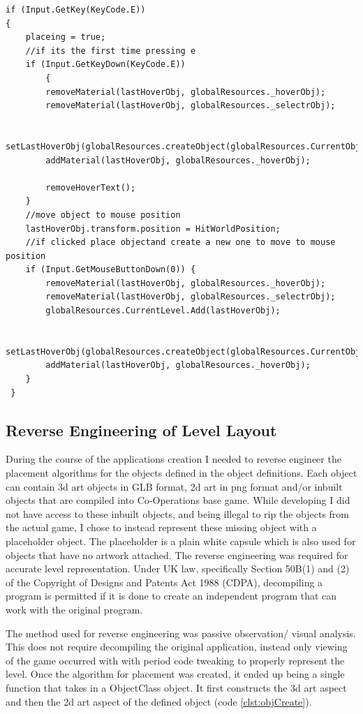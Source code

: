 \begin{minipage}{\textwidth}
\begin{lstlisting}[language={[Sharp]C}, caption=object placement code with highlighting, label=clst:objPlcHov]
if (Input.GetKey(KeyCode.E))
{
	placeing = true;
	//if its the first time pressing e
	if (Input.GetKeyDown(KeyCode.E))
		{
		removeMaterial(lastHoverObj, globalResources._hoverObj);
		removeMaterial(lastHoverObj, globalResources._selectrObj);

		setLastHoverObj(globalResources.createObject(globalResources.CurrentObjectSelectID));
		addMaterial(lastHoverObj, globalResources._hoverObj);

		removeHoverText();
	}
	//move object to mouse position
	lastHoverObj.transform.position = HitWorldPosition;
	//if clicked place objectand create a new one to move to mouse position
	if (Input.GetMouseButtonDown(0)) {
		removeMaterial(lastHoverObj, globalResources._hoverObj);
		removeMaterial(lastHoverObj, globalResources._selectrObj);
		globalResources.CurrentLevel.Add(lastHoverObj);

		setLastHoverObj(globalResources.createObject(globalResources.CurrentObjectSelectID));
		addMaterial(lastHoverObj, globalResources._hoverObj);
	}
 }
\end{lstlisting}
\end{minipage}

\subsection{Reverse Engineering of Level Layout}
During the course of the applications creation I needed to reverse engineer the placement algorithms for the objects defined in the object definitions. Each object can contain 3d art objects in GLB format, 2d art in png format and/or inbuilt objects that are compiled into Co-Operations base game. While developing I did not have access to these inbuilt objects, and being illegal to rip the objects from the actual game, I chose to instead represent these missing object with a placeholder object. The placeholder is a plain white capsule which is also used for objects that have no artwork attached.
The reverse engineering was required for accurate level representation. Under UK law, specifically Section 50B(1) and (2) of the Copyright of Designs and Patents Act 1988 (CDPA), decompiling a program is permitted if it is done to create an independent program that can work with the original program. 

The method used for reverse engineering was passive observation/ visual analysis. This does not require decompiling the original application, instead only viewing of the game occurred with with period code tweaking to properly represent the level. Once the algorithm for placement was created, it ended up being a single function that takes in a ObjectClass object. It first constructs the 3d art aspect and then the 2d art aspect of the defined object (code \ref{clst:objCreate}). 

